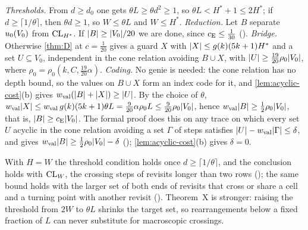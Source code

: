 \begin{outline}
\emph{Thresholds.} From $d\ge d_0$ one gets $\theta L\ge\theta d^2\ge1$, so $\theta L<H^*+1\le2H^*$; if $d\ge\lceil1/\theta\rceil$,
then $\theta d\ge1$, so $W\le\theta L$ and $W\le H^*$.
\emph{Reduction.} Let $B$ separate $u_0(V_0)$ from $\mathrm{CL}_{H^*}$. If $\lvert B \rvert\ge\lvert V_0 \rvert/20$ we are done, since $c_{\mathrm{E}}\le\frac1{30}$
(). \emph{Bridge.} Otherwise \cref{thm:D} at $c=\frac1{20}$ gives a guard $X$ with
$\lvert X \rvert\le g(k)(5k+1)H^*$ and a set $U\subseteq V_0$, independent in the cone relation avoiding $B\cup X$, with
$\lvert U \rvert\ge\frac{19}{20}\rho_0\lvert V_0 \rvert$, where $\rho_0=\rho_0(k,C,\frac{19}{20}\alpha)$. \emph{Coding.} No genie is needed: the cone relation has no depth bound, so the values on
$B\cup X$ form an index code for it, and \cref{lem:acyclic-cost}(b) gives $w_{\mathrm{val}}(\lvert B \rvert+\lvert X \rvert)\ge\lvert U \rvert$. By the choice of $\theta$,
$w_{\mathrm{val}}\lvert X \rvert\le w_{\mathrm{val}}\,g(k)(5k+1)\theta L=\frac9{20}\alpha\rho_0L\le\frac9{20}\rho_0\lvert V_0 \rvert$, hence $w_{\mathrm{val}}\lvert B \rvert\ge\frac12\rho_0\lvert V_0 \rvert$,
that is, $\lvert B \rvert\ge c_{\mathrm{E}}\lvert V_0 \rvert$. The formal proof does this on any trace on which every set $U$ acyclic in the cone relation
avoiding a set $\Gamma$ of steps satisfies $\lvert U \rvert-w_{\mathrm{val}}\lvert \Gamma \rvert\le\delta$, and gives $w_{\mathrm{val}}\lvert B \rvert\ge\frac12\rho_0\lvert V_0 \rvert-\delta$
(); \cref{lem:acyclic-cost}(b) gives $\delta=0$.
\end{outline}

\begin{remark}\label{rem:2W}
With $H=W$ the threshold condition holds once $d\ge\lceil1/\theta\rceil$, and the conclusion holds with $\mathrm{CL}_W$, the crossing steps of
revisits longer than two rows (); the same bound holds with the larger set of
both ends of revisits that cross or share a cell and a turning point with another revisit
(). Theorem~X is stronger: raising the threshold from $2W$ to $\theta L$ shrinks the
target set, so rearrangements below a fixed fraction of $L$ can never substitute for macroscopic crossings.
\end{remark}

